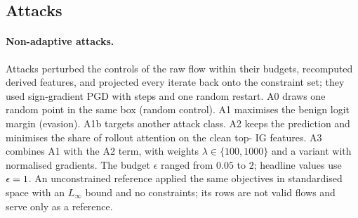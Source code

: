 \subsection{Attacks}
\label{sec:attacks}
\paragraph{Non-adaptive attacks.}
Attacks perturbed the controls of the raw flow within their budgets, recomputed derived features, and projected every
iterate back onto the constraint set; they used sign-gradient PGD with \paramSteps{} steps and one random restart.
A0 draws one random point in the same box (random control).
A1 maximises the benign logit margin (evasion).
A1b targets another attack class.
A2 keeps the prediction and minimises the share of rollout attention on the clean top-\paramTopK{} IG features.
A3 combines A1 with the A2 term, with weights $\lambda \in \{100, 1000\}$ and a variant with normalised gradients.
The budget $\epsilon$ ranged from $0.05$ to $2$; headline values use $\epsilon = 1$.
An unconstrained reference applied the same objectives in standardised space with an $L_\infty$ bound and no
constraints; its rows are not valid flows and serve only as a reference.


